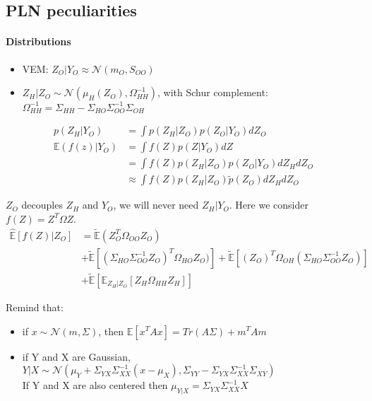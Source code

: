 \documentclass[11pt,a4paper]{article}
\newcommand{\Esp}{\mathds{E}}
\begin{document}
\subsection{PLN peculiarities}
\paragraph{Distributions}
\begin{itemize}
\item VEM: $Z_O|Y_O \approx \mathcal{N}(m_O,S_{OO})$

\item $Z_H|Z_O \sim \mathcal{N}(\mu_H(Z_O), \Omega_{HH}^{-1})$, with Schur complement: $\Omega_{HH}^{-1} = \Sigma_{HH} -\Sigma_{HO}\Sigma_{OO}^{-1}\Sigma_{OH}$
\end{itemize}

\begin{align*}
p(Z_H|Y_O)&=\int p(Z_H|Z_O) p(Z_O|Y_O) dZ_O\\
\Esp(f(z)|Y_O) &=\int f(Z) p(Z|Y_O) dZ\\
&=\int f(Z) p(Z_H|Z_O) p(Z_O|Y_O) dZ_H dZ_O\\
&\approx \int f(Z) p(Z_H|Z_O)\tilde{p}(Z_O) dZ_H dZ_O
\end{align*}



$Z_O$ decouples $Z_H$ and $Y_O$, we will never need $Z_H|Y_O$. Here we consider $f(Z) = Z^T\Omega Z$.
\begin{align*}
\widehat{\Esp}[f(Z)|Z_O] &= \tilde{\Esp}(Z_O^T\Omega_{OO}Z_O)\\
& +\tilde{\Esp}\left[(\Sigma_{HO}\Sigma_{OO}^{-1} Z_O)^T \Omega_{HO}Z_O)\right] +\tilde{\Esp}\left[(Z_O)^T \Omega_{OH} (\Sigma_{HO}\Sigma_{OO}^{-1} Z_O)\right]\\
&+ \tilde{\Esp}\left[\Esp_{Z_H|Z_O} [Z_H\Omega_{HH}Z_H]\right]
\end{align*}


\vspace{2cm}
Remind that:
\begin{itemize}
\item if $x\sim\mathcal{N}(m, \Sigma)$, then
$\Esp[x^TAx] = Tr(A\Sigma) + m^TAm$
\item if Y and X are Gaussian, $Y|X \sim \mathcal{N}(\mu_Y+\Sigma_{YX}\Sigma_{XX}^{-1}(x-\mu_X) , \Sigma_{YY} - \Sigma_{YX}\Sigma_{XX}^{-1}\Sigma_{XY})$\\
If Y and X are also centered then $\mu_{Y|X} = \Sigma_{YX}\Sigma_{XX}^{-1} X$
\end{itemize}
\end{document}
